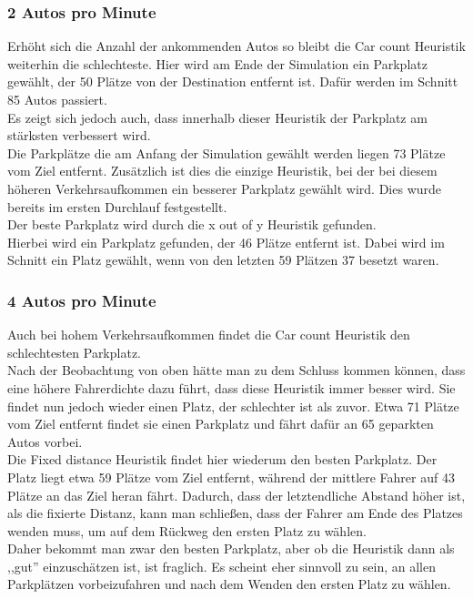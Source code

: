 \subsubsection{2 Autos pro Minute}

Erhöht sich die Anzahl der ankommenden Autos so bleibt die Car count Heuristik weiterhin die schlechteste.
Hier wird am Ende der Simulation ein Parkplatz gewählt, der 50 Plätze von der Destination entfernt ist. Dafür werden im Schnitt 85 Autos passiert.\\
Es zeigt sich jedoch auch, dass innerhalb dieser Heuristik der Parkplatz am stärksten verbessert wird.\\
Die Parkplätze die am Anfang der Simulation gewählt werden liegen 73 Plätze vom Ziel entfernt. Zusätzlich ist dies die einzige Heuristik, bei der bei diesem höheren Verkehrsaufkommen ein besserer Parkplatz gewählt wird. Dies wurde bereits im ersten Durchlauf festgestellt.\\
Der beste Parkplatz wird durch die x out of y Heuristik gefunden.\\
Hierbei wird ein Parkplatz gefunden, der 46 Plätze entfernt ist. Dabei wird im Schnitt ein Platz gewählt, wenn von den letzten 59 Plätzen 37 besetzt waren.

\subsubsection{4 Autos pro Minute}

Auch bei hohem Verkehrsaufkommen findet die Car count Heuristik den schlechtesten Parkplatz. \\
Nach der Beobachtung von oben hätte man zu dem Schluss kommen können, dass eine höhere Fahrerdichte dazu führt, dass diese Heuristik immer besser wird. Sie findet nun jedoch wieder einen Platz, der schlechter ist als zuvor. Etwa 71 Plätze vom Ziel entfernt findet sie einen Parkplatz und fährt dafür an 65 geparkten Autos vorbei.\\
Die Fixed distance Heuristik findet hier wiederum den besten Parkplatz. 
Der Platz liegt etwa 59 Plätze vom Ziel entfernt, während der mittlere Fahrer auf 43 Plätze an das Ziel heran fährt. Dadurch, dass der letztendliche Abstand höher ist, als die fixierte Distanz, kann man schließen, dass der Fahrer am Ende des Platzes wenden muss, um auf dem Rückweg den ersten Platz zu wählen.\\
  Daher bekommt man zwar den besten Parkplatz, aber ob die Heuristik dann als ,,gut'' einzuschätzen ist, ist fraglich. Es scheint eher sinnvoll zu sein, an allen Parkplätzen vorbeizufahren und nach dem Wenden den ersten Platz zu wählen. \\
  
